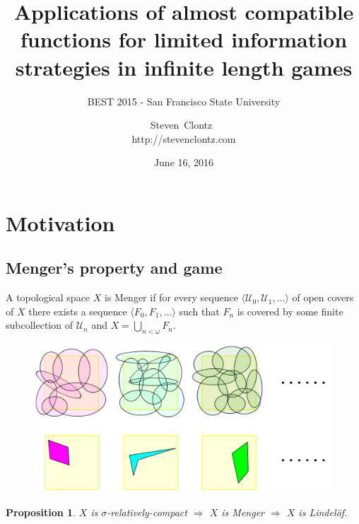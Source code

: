 \documentclass{beamer}
\title
{Applications of almost compatible functions for limited information strategies in infinite length games}
\subtitle
{BEST 2015 - San Francisco State University} %
\author%
{Steven~Clontz~\\http://stevenclontz.com}%
\institute[Auburn, AL] %
{
  Auburn, AL}
\date[15-06-16] %
{June 16, 2016}
\newtheorem{proposition}[theorem]{Proposition}
\theoremstyle{example}
\theoremstyle{definition}
\newcommand{\<}{\langle}
\renewcommand{\>}{\rangle}
\newcommand{\mc}[1]{\mathcal{#1}}
\begin{document}
\newcommand{\vpause}{\pause\vspace{1em}}

\begin{frame}
  \titlepage
\end{frame}

\section{Motivation}

\subsection{Menger's property and game}

\begin{frame}\small
  \begin{definition}
    A topological space \(X\) is Menger if for every sequence
    \(\<\mc U_0,\mc U_1,\dots\>\)
    of open covers of \(X\) there exists a sequence
    \(\<F_0,F_1,\dots\>\) such that
    \(F_n\) is covered by some finite subcollection of \(\mc U_n\)
    and \(X=\bigcup_{n<\omega}F_n\).
    \begin{figure}
      \includegraphics[width=0.6\linewidth]{mengerProperty.pdf}
    \end{figure}
  \end{definition}

  \pause

  \begin{proposition}
    \(X\) is \(\sigma\)-relatively-compact
      \(\Rightarrow\)
    \(X\) is Menger
      \(\Rightarrow\)
    \(X\) is Lindel\"of.
  \end{proposition}
\end{frame}
\end{document}
